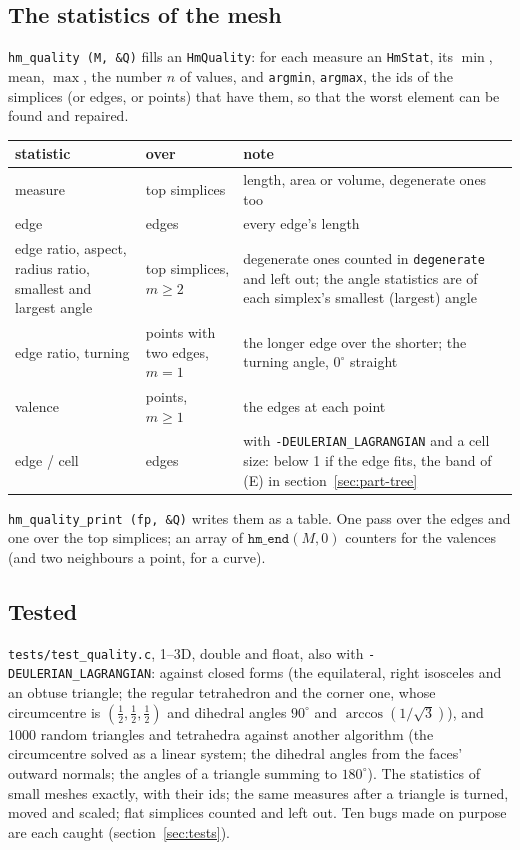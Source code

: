 \documentclass[10pt,a4paper]{article}
\theoremstyle{definition}
\newcommand{\fn}[1]{\texttt{#1}}
\begin{document}
\subsection{The statistics of the mesh}

\fn{hm\_quality (M, \&Q)} fills an \fn{HmQuality}: for each measure an
\fn{HmStat}, its $\min$, mean, $\max$, the number $n$ of values, and
\fn{argmin}, \fn{argmax}, the ids of the simplices (or edges, or points)
that have them, so that the worst element can be found and repaired.

\begin{center}
\small
\begin{tabularx}{\textwidth}{@{}>{\raggedright}p{}
    >{\raggedright}p{}X@{}}
  \toprule
  statistic & over & note \\
  \midrule
  measure & top simplices & length, area or volume, degenerate ones too \\
  edge & edges & every edge's length \\
  edge ratio, aspect, radius ratio, smallest and largest angle & top
    simplices, $m \ge 2$ & degenerate ones counted in \fn{degenerate} and
    left out; the angle statistics are of each simplex's smallest (largest)
    angle \\
  edge ratio, turning & points with two edges, $m = 1$ & the longer edge
    over the shorter; the turning angle, $0^\circ$ straight \\
  valence & points, $m \ge 1$ & the edges at each point \\
  edge / cell & edges & with \fn{-DEULERIAN\_LAGRANGIAN} and a cell size:
    below 1 if the edge fits, the band of (E) in
    section~\ref{sec:part-tree} \\
  \bottomrule
\end{tabularx}
\end{center}

\fn{hm\_quality\_print (fp, \&Q)} writes them as a table. One pass over
the edges and one over the top simplices; an array of $\fn{hm\_end}(M,
0)$ counters for the valences (and two neighbours a point, for a curve).

\subsection{Tested}

\fn{tests/test\_quality.c}, 1--3D, double and float, also with
\fn{-DEULERIAN\_LAGRANGIAN}: against closed forms (the equilateral, right
isosceles and an obtuse triangle; the regular tetrahedron and the corner
one, whose circumcentre is $(\tfrac12, \tfrac12, \tfrac12)$ and dihedral
angles $90^\circ$ and $\arccos(1/\sqrt3)$), and 1000 random triangles and
tetrahedra against another algorithm (the circumcentre solved as a linear
system; the dihedral angles from the faces' outward normals; the angles of
a triangle summing to $180^\circ$). The statistics of small meshes exactly,
with their ids; the same measures after a triangle is turned, moved and
scaled; flat simplices counted and left out. Ten bugs made on purpose are
each caught (section~\ref{sec:tests}).
\end{document}

